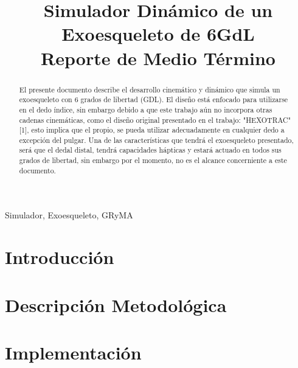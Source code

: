 \documentclass[journal]{IEEEtran}
\begin{document}
    \title{Simulador Dinámico de un Exoesqueleto de 6GdL\\
    \small{Reporte de Medio Término}}

    \author{
    }

    \maketitle

    \begin{abstract}
        El presente documento describe el desarrollo cinemático y dinámico que simula un exoesqueleto
        con 6 grados de libertad (GDL).
        \noindent El diseño está enfocado para utilizarse en el dedo índice, sin embargo debido a que
        este trabajo aún no incorpora otras cadenas cinemáticas, como el diseño original presentado en
        el trabajo: "HEXOTRAC"[1], esto implica que el propio, se pueda utilizar adecuadamente en
        cualquier dedo a excepción del pulgar. 
        \noindent Una de las características que tendrá el exoesqueleto presentado, será que el dedal
        distal, tendrá capacidades hápticas y estará actuado en todos sus grados de libertad,
        sin embargo por el momento, no es el alcance concerniente a este documento.         
    \end{abstract}

    \begin{IEEEkeywords}
    Simulador, Exoesqueleto, GRyMA
    \end{IEEEkeywords}

    \section{Introducción}


    \section{Descripción Metodológica}

    
    


    \section{Implementación}
\end{document}
